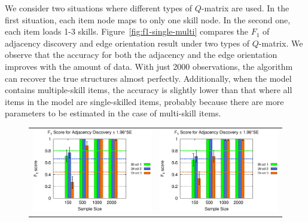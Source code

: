 \documentclass{edm_template}
\begin{document}
{	We consider two situations where different types of $Q$-matrix are used. In the first situation,
	each item node maps to only one skill node. In the second one, each item loads 1-3 skills. 
	Figure~\ref{fig:f1-single-multi} compares the $F_1$ of adjacency discovery and edge orientation result under two types of $Q$-matrix.
	We observe that the accuracy for both the adjacency and the edge orientation  improves with the amount of data.
	With just 2000 observations, the algorithm can recover the true structures almost perfectly.
	Additionally, when the model contains multiple-skill items, the accuracy is slightly lower than that where all items in the model are single-skilled items,
	probably because there are more parameters to be estimated in the case of multi-skill items. 
	
	\begin{figure}[!ht]
		\begin{center}
			\begin{tabular}{>{\centering}m{1.5in} >{\centering\arraybackslash}m{1.5in}}
				\includegraphics[width=1.1\linewidth]{figures/F1A_single.eps} &\includegraphics[width=1.1\linewidth]{figures/F1A_multi.eps}\\

\end{tabular}
\end{center}
\end{figure}}
\end{document}
